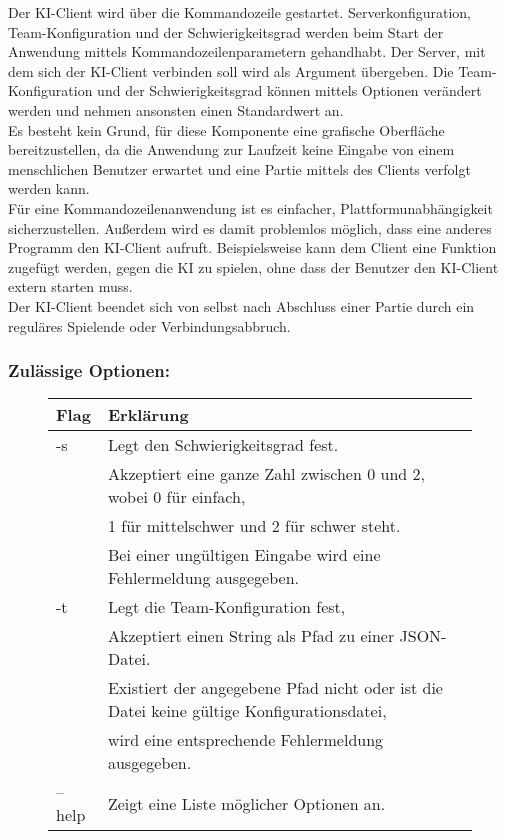Der KI-Client wird über die Kommandozeile gestartet. Serverkonfiguration, Team-Konfiguration und der Schwierigkeitsgrad werden beim Start der Anwendung mittels Kommandozeilenparametern gehandhabt. Der Server, mit dem sich der KI-Client verbinden soll wird als Argument übergeben. Die Team-Konfiguration und der Schwierigkeitsgrad können mittels Optionen verändert werden und nehmen ansonsten einen Standardwert an.\\
Es besteht kein Grund, für diese Komponente eine grafische Oberfläche bereitzustellen, da die Anwendung zur Laufzeit keine Eingabe von einem menschlichen Benutzer erwartet und eine Partie mittels des Clients verfolgt werden kann. \\
Für eine Kommandozeilenanwendung ist es einfacher, Plattformunabhängigkeit sicherzustellen. Außerdem wird es damit problemlos möglich, dass eine anderes Programm den KI-Client aufruft. Beispielsweise kann dem Client eine Funktion zugefügt werden, gegen die KI zu spielen, ohne dass der Benutzer den KI-Client extern starten muss.\\
Der KI-Client beendet sich von selbst nach Abschluss einer Partie durch ein reguläres Spielende oder Verbindungsabbruch.\\

\subsubsection{Zulässige Optionen:}
\begin{figure}[H]
    \centering
    \begin{tabular}{|p{2cm}|p{12cm} |}
        \hline
        Flag & Erklärung \\\hline
        -s & Legt den Schwierigkeitsgrad fest.\\
        & Akzeptiert eine ganze Zahl zwischen 0 und 2, wobei 0 für einfach,\\
        & 1 für mittelschwer und 2 für schwer steht.\\
        & Bei einer ungültigen Eingabe wird eine Fehlermeldung ausgegeben.\\\hline
        -t & Legt die Team-Konfiguration fest,\\
        & Akzeptiert einen String als Pfad zu einer JSON-Datei.\\
        & Existiert der angegebene Pfad nicht oder ist die Datei keine gültige Konfigurationsdatei,\\
        & wird eine entsprechende Fehlermeldung ausgegeben.\\\hline
        --help & Zeigt eine Liste möglicher Optionen an.\\\hline
    \end{tabular}
\end{figure}
